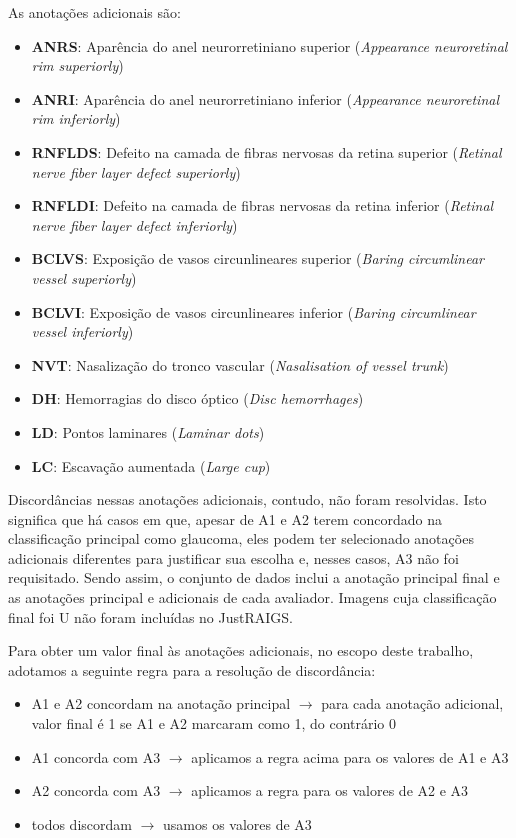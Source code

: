 \documentclass[12pt]{article}
\begin{document}
As anotações adicionais são:
\begin{itemize}
    \setlength\itemsep{0em}
    \item \textbf{ANRS}: Aparência do anel neurorretiniano superior (\emph{Appearance neuroretinal rim superiorly})
    \item \textbf{ANRI}: Aparência do anel neurorretiniano inferior (\emph{Appearance neuroretinal rim inferiorly})
    \item \textbf{RNFLDS}: Defeito na camada de fibras nervosas da retina superior (\emph{Retinal nerve fiber layer defect superiorly})
    \item \textbf{RNFLDI}: Defeito na camada de fibras nervosas da retina inferior (\emph{Retinal nerve fiber layer defect inferiorly})
    \item \textbf{BCLVS}: Exposição de vasos circunlineares superior (\emph{Baring circumlinear vessel superiorly})
    \item \textbf{BCLVI}: Exposição de vasos circunlineares inferior (\emph{Baring circumlinear vessel inferiorly})
    \item \textbf{NVT}: Nasalização do tronco vascular (\emph{Nasalisation of vessel trunk})
    \item \textbf{DH}: Hemorragias do disco óptico (\emph{Disc hemorrhages})
    \item \textbf{LD}: Pontos laminares (\emph{Laminar dots})
    \item \textbf{LC}: Escavação aumentada (\emph{Large cup})
\end{itemize}

Discordâncias nessas anotações adicionais, contudo, não foram resolvidas. Isto significa que há casos em que, apesar de A1 e A2 terem concordado na classificação principal como glaucoma, eles podem ter selecionado anotações adicionais diferentes para justificar sua escolha e, nesses casos, A3 não foi requisitado. Sendo assim, o conjunto de dados inclui a anotação principal final e as anotações principal e adicionais de cada avaliador. Imagens cuja classificação final foi U não foram incluídas no JustRAIGS.


Para obter um valor final às anotações adicionais, no escopo deste trabalho, adotamos a seguinte regra para a resolução de discordância:

\begin{itemize}[noitemsep,topsep=0pt]
    \item A1 e A2 concordam na anotação principal $\rightarrow$ para cada anotação adicional, valor final é 1 se A1 e A2 marcaram como 1, do contrário 0
    \item A1 concorda com A3 $\rightarrow$ aplicamos a regra acima para os valores de A1 e A3
    \item A2 concorda com A3 $\rightarrow$ aplicamos a regra para os valores de A2 e A3
    \item todos discordam $\rightarrow$ usamos os valores de A3
\end{itemize}
\end{document}
